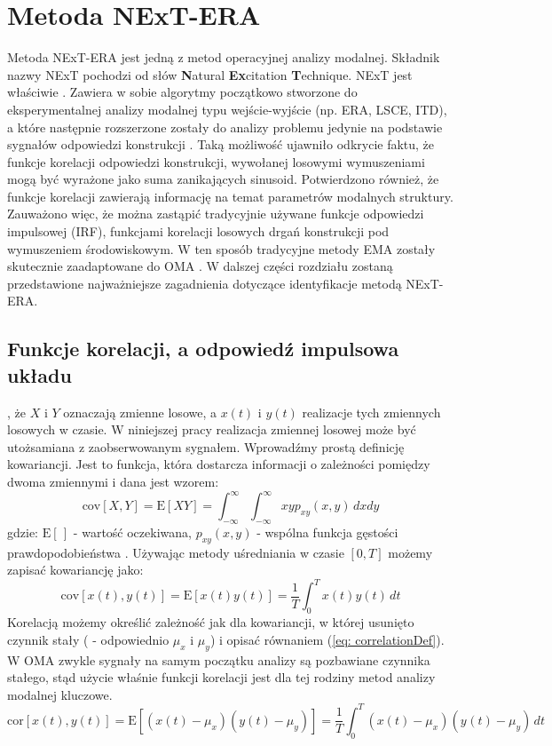 \section{Metoda NExT-ERA}
Metoda NExT-ERA jest jedną z metod operacyjnej analizy modalnej. Składnik nazwy NExT pochodzi od słów \textbf{N}atural \textbf{Ex}citation \textbf{T}echnique. NExT jest właściwie . Zawiera w sobie algorytmy początkowo stworzone do eksperymentalnej analizy modalnej typu wejście-wyjście  (np. ERA, LSCE, ITD), a które następnie rozszerzone zostały do analizy problemu jedynie na podstawie sygnałów odpowiedzi konstrukcji . Taką możliwość ujawniło odkrycie faktu, że funkcje korelacji odpowiedzi konstrukcji, wywołanej losowymi wymuszeniami mogą być wyrażone jako suma zanikających sinusoid. Potwierdzono również, że funkcje korelacji zawierają informację na temat parametrów modalnych struktury. Zauważono więc, że można zastąpić tradycyjnie używane funkcje odpowiedzi impulsowej (IRF), funkcjami korelacji losowych drgań konstrukcji pod wymuszeniem środowiskowym. W ten sposób tradycyjne metody EMA zostały skutecznie zaadaptowane do OMA \parencite{Rainieri2014}. W dalszej części rozdziału zostaną przedstawione najważniejsze zagadnienia dotyczące identyfikacje metodą NExT-ERA. 

\subsection{Funkcje korelacji, a odpowiedź impulsowa układu} \label{sect: correlationFunction}
, że $X$ i $Y$ oznaczają zmienne losowe, a $x(t)$ i $y(t)$ realizacje tych zmiennych losowych w czasie. W niniejszej pracy realizacja zmiennej losowej może być utożsamiana z zaobserwowanym sygnałem. Wprowadźmy prostą definicję kowariancji. Jest to funkcja, która dostarcza informacji o zależności pomiędzy dwoma zmiennymi i dana jest wzorem:
\begin{equation}
	\mathrm{cov}[X,Y] = \mathrm{E}[XY]=\int_{-\infty}^{\infty}\int_{-\infty}^{\infty}xyp_{xy}(x,y)\,dxdy
\end{equation}
gdzie: $\mathrm{E}[\,]$ - wartość oczekiwana, $p_{xy}(x,y)$ - wspólna funkcja gęstości prawdopodobieństwa . Używając metody uśredniania w czasie $[0,T]$ możemy zapisać kowariancję jako:
\begin{equation}
	\mathrm{cov}[x(t),y(t)] = \mathrm{E}[x(t)y(t)]=\frac{1}{T}\int_{0}^{T}x(t)y(t) \,dt
\end{equation}
Korelacją możemy określić zależność jak dla kowariancji, w której usunięto czynnik stały ( - odpowiednio $\mu_x$ i $\mu_y$) i opisać równaniem (\ref{eq: correlationDef}). W OMA zwykle sygnały na samym początku analizy są pozbawiane czynnika stałego, stąd użycie właśnie funkcji korelacji jest dla tej rodziny metod analizy modalnej kluczowe.
\begin{equation} \label{eq: correlationDef}
	\mathrm{cor}[x(t),y(t)] = \mathrm{E}[(x(t)-\mu_x)(y(t)-\mu_y)]=\frac{1}{T}\int_{0}^{T}(x(t)-\mu_x)(y_{}(t)-\mu_y) \,dt
\end{equation}

